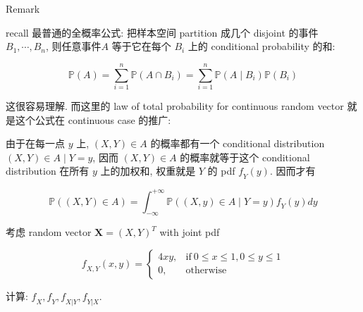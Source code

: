 \begin{qlremark}{Remark}

recall 最普通的全概率公式: 把样本空间 partition 成几个 disjoint 的事件 \(\mathit{B}_{1},\cdots,\mathit{B}_{\mathit{n}}\), 则任意事件\(\mathit{A}\) 等于它在每个 \(\mathit{B}_{\mathit{i}}\) 上的 conditional probability 的和:

\[\mathbb{P}(\mathit{A}) = \sum\limits_{\mathit{i} = 1}^{\mathit{n}}\mathbb{P}(\mathit{A} \cap \mathit{B}_{\mathit{i}}) = \sum\limits_{\mathit{i} = 1}^{\mathit{n}}\mathbb{P}(\mathit{A} \mid \mathit{B}_{\mathit{i}})\mathbb{P}(\mathit{B}_{\mathit{i}})\]

这很容易理解. 而这里的 law of total probability for continuous random vector 就是这个公式在 continuous case 的推广:

由于在每一点 \(\mathit{y}\) 上, \((\mathit{X},\mathit{Y}) \in \mathit{A}\) 的概率都有一个 conditional distribution \(\left. (\mathit{X},\mathit{Y}) \in \mathit{A} \middle| \mathit{Y} = \mathit{y} \right.\), 因而 \((\mathit{X},\mathit{Y}) \in \mathit{A}\) 的概率就等于这个 conditional distribution 在所有 \(\mathit{y}\) 上的加权和, 权重就是 \(\mathit{Y}\) 的 pdf \(\mathit{f}_{\mathit{Y}}(\mathit{y})\). 因而才有

\[\mathbb{P}((\mathit{X},\mathit{Y}) \in \mathit{A}) = \int_{- \infty}^{+ \infty}\mathbb{P}((\mathit{X},\mathit{y}) \in \mathit{A} \mid \mathit{Y} = \mathit{y})\mathit{f}_{\mathit{Y}}(\mathit{y})\mathit{d}\mathit{y}\]

\end{qlremark}

\begin{example}

考虑 random vector \(\mathbf{X} = (\mathit{X},\mathit{Y})^{\mathit{T}}\) with joint pdf

\[\mathit{f}_{\mathit{X},\mathit{Y}}(\mathit{x},\mathit{y}) = \left\{ \begin{matrix}
{4\mathit{x}\mathit{y},} & {\text{if}\ 0 \leq \mathit{x} \leq 1,0 \leq \mathit{y} \leq 1} \\
{0,} & \text{otherwise}
\end{matrix} \right.\]

计算: \(\mathit{f}_{\mathit{X}},\mathit{f}_{\mathit{Y}},\mathit{f}_{\mathit{X}|\mathit{Y}},\mathit{f}_{\mathit{Y}|\mathit{X}}\).

\end{example}


